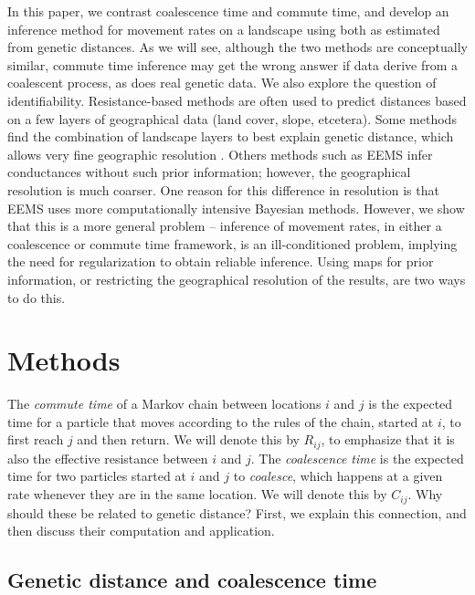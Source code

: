 \documentclass{article}
\newcommand{\plr}[1]{{\em \color{blue} #1}}
\begin{document}
In this paper, we contrast 
coalescence time and commute time,
and develop an inference method for movement rates on a landscape
using both as estimated from genetic distances.
As we will see,
although the two methods are conceptually similar,
commute time inference may get the wrong answer if data derive from a coalescent process,
as does real genetic data.
We also explore the question of identifiability.
Resistance-based methods are often used to predict distances based on a few layers of geographical data
(land cover, slope, etcetera).
Some methods find the combination of landscape layers to best explain genetic distance,
which allows very fine geographic resolution \citep{infer_resistance}.
Others methods such as EEMS \citep{eems} infer conductances without such prior information;
however, the geographical resolution is much coarser.
One reason for this difference in resolution
is that EEMS uses more computationally intensive Bayesian methods.
However, we show that this is a more general problem --
inference of movement rates, in either a coalescence or commute time framework,
is an ill-conditioned problem,
implying the need for regularization to obtain reliable inference.
Using maps for prior information, or restricting the geographical resolution of the results,
are two ways to do this.



\section*{Methods}


The \emph{commute time} of a Markov chain between locations $i$ and $j$
is the expected time for a particle that moves according to the rules of the chain, 
started at $i$, to first reach $j$ and then return.
We will denote this by $R_{ij}$, to emphasize that it is also the effective resistance
between $i$ and $j$.
The \emph{coalescence time} is the expected time for two particles started at $i$ and $j$
to \emph{coalesce},
which happens at a given rate whenever they are in the same location.
We will denote this by $C_{ij}$.
Why should these be related to genetic distance? 
First, we explain this connection,
and then discuss their computation and application.


\subsection*{Genetic distance and coalescence time}
\end{document}
